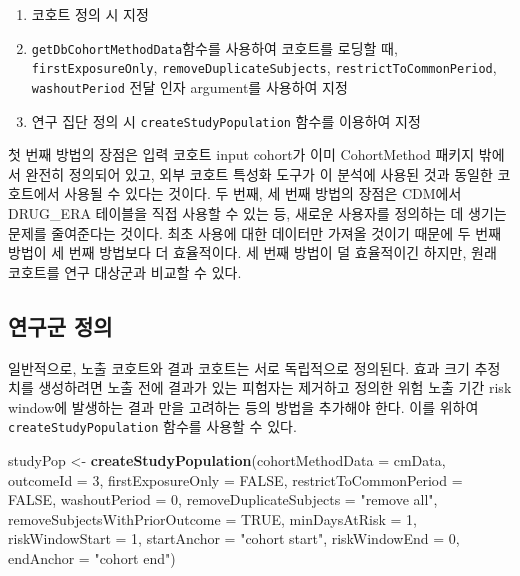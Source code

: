 \documentclass[10.5pt]{book}
\newenvironment{Shaded}{\begin{snugshade}}{\end{snugshade}}
\newcommand{\KeywordTok}[1]{\textcolor[rgb]{0.13,0.29,0.53}{\textbf{#1}}}
\newcommand{\DataTypeTok}[1]{\textcolor[rgb]{0.13,0.29,0.53}{#1}}
\newcommand{\DecValTok}[1]{\textcolor[rgb]{0.00,0.00,0.81}{#1}}
\newcommand{\StringTok}[1]{\textcolor[rgb]{0.31,0.60,0.02}{#1}}
\newcommand{\OtherTok}[1]{\textcolor[rgb]{0.56,0.35,0.01}{#1}}
\newcommand{\NormalTok}[1]{#1}
\providecommand{\tightlist}{%
  \setlength{\itemsep}{0pt}\setlength{\parskip}{0pt}}
\theoremstyle{definition}
\theoremstyle{definition}
\theoremstyle{definition}
\theoremstyle{remark}
\begin{document}
\begin{enumerate}
\def\labelenumi{\arabic{enumi}.}
\tightlist
\item
  코호트 정의 시 지정
\item
  \texttt{getDbCohortMethodData}함수를 사용하여 코호트를 로딩할 때,
  \texttt{firstExposureOnly}, \texttt{removeDuplicateSubjects},
  \texttt{restrictToCommonPeriod}, \texttt{washoutPeriod} 전달 인자
  argument를 사용하여 지정
\item
  연구 집단 정의 시 \texttt{createStudyPopulation} 함수를 이용하여 지정
\end{enumerate}

첫 번째 방법의 장점은 입력 코호트 input cohort가 이미 CohortMethod
패키지 밖에서 완전히 정의되어 있고, 외부 코호트 특성화 도구가 이 분석에
사용된 것과 동일한 코호트에서 사용될 수 있다는 것이다. 두 번째, 세 번째
방법의 장점은 CDM에서 DRUG\_ERA 테이블을 직접 사용할 수 있는 등, 새로운
사용자를 정의하는 데 생기는 문제를 줄여준다는 것이다. 최초 사용에 대한
데이터만 가져올 것이기 때문에 두 번째 방법이 세 번째 방법보다 더
효율적이다. 세 번째 방법이 덜 효율적이긴 하지만, 원래 코호트를 연구
대상군과 비교할 수 있다.

\subsection{연구군 정의}\label{-}

일반적으로, 노출 코호트와 결과 코호트는 서로 독립적으로 정의된다. 효과
크기 추정치를 생성하려면 노출 전에 결과가 있는 피험자는 제거하고 정의한
위험 노출 기간 risk window에 발생하는 결과 만을 고려하는 등의 방법을
추가해야 한다. 이를 위하여 \texttt{createStudyPopulation} 함수를 사용할
수 있다.

\begin{Shaded}
\begin{Highlighting}[]
\NormalTok{studyPop <-}\StringTok{ }\KeywordTok{createStudyPopulation}\NormalTok{(}\DataTypeTok{cohortMethodData =}\NormalTok{ cmData,}
                                  \DataTypeTok{outcomeId =} \DecValTok{3}\NormalTok{,}
                                  \DataTypeTok{firstExposureOnly =} \OtherTok{FALSE}\NormalTok{,}
                                  \DataTypeTok{restrictToCommonPeriod =} \OtherTok{FALSE}\NormalTok{,}
                                  \DataTypeTok{washoutPeriod =} \DecValTok{0}\NormalTok{,}
                                  \DataTypeTok{removeDuplicateSubjects =} \StringTok{"remove all"}\NormalTok{,}
                                  \DataTypeTok{removeSubjectsWithPriorOutcome =} \OtherTok{TRUE}\NormalTok{,}
                                  \DataTypeTok{minDaysAtRisk =} \DecValTok{1}\NormalTok{,}
                                  \DataTypeTok{riskWindowStart =} \DecValTok{1}\NormalTok{,}
                                  \DataTypeTok{startAnchor =} \StringTok{"cohort start"}\NormalTok{,}
                                  \DataTypeTok{riskWindowEnd =} \DecValTok{0}\NormalTok{,}
                                  \DataTypeTok{endAnchor =} \StringTok{"cohort end"}\NormalTok{)}
\end{Highlighting}
\end{Shaded}
\end{document}
